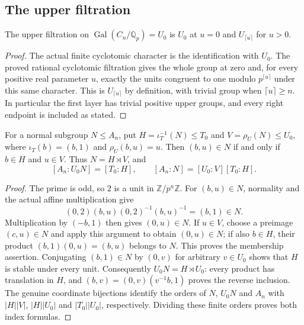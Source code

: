 \subsection{The upper filtration}

\begin{lemma}
\label{ft:cyclotomic-upper-filtration}
\leanok{}
The upper filtration on $\operatorname{Gal}(C_n/\mathbb Q_p)=U_0$ is
$U_0$ at $u=0$ and $U_{\lceil u\rceil}$ for $u>0$.
\end{lemma}
\begin{proof}
The actual finite cyclotomic character is the identification with $U_0$.
The proved rational cyclotomic filtration gives the whole group at zero
and, for every positive real parameter $u$, exactly the units congruent
to one modulo $p^{\lceil u\rceil}$ under this same character.
This is $U_{\lceil u\rceil}$ by definition, with trivial group when
$\lceil u\rceil\geq n$. In particular the first layer has trivial
positive upper groups, and every right endpoint is included as stated.
\end{proof}

\begin{lemma}
\label{ft:normal-affine-subgroup}
\leanok
For a normal subgroup $N\leq A_n$, put
$H=\iota_T^{-1}(N)\leq T_0$ and $V=\rho_U(N)\leq U_0$, where
$\iota_T(b)=(b,1)$ and $\rho_U(b,u)=u$.
Then $(b,u)\in N$ if and only if $b\in H$ and $u\in V$.
Thus $N=H\rtimes V$, and
\[
 [A_n:U_0N]=[T_0:H],\qquad
 [A_n:N]=[U_0:V][T_0:H].
\]
\end{lemma}
\begin{proof}
The prime is odd, so $2$ is a unit in $\mathbb Z/p^n\mathbb Z$.
For $(b,u)\in N$, normality and the actual affine multiplication give
\[
 (0,2)(b,u)(0,2)^{-1}(b,u)^{-1}=(b,1)\in N.
\]
Multiplication by $(-b,1)$ then gives $(0,u)\in N$.
If $u\in V$, choose a preimage $(c,u)\in N$ and apply this argument
to obtain $(0,u)\in N$; if also $b\in H$, their product
$(b,1)(0,u)=(b,u)$ belongs to $N$. This proves the membership assertion.
Conjugating $(b,1)\in N$ by $(0,v)$ for arbitrary $v\in U_0$ shows
that $H$ is stable under every unit. Consequently $U_0N=H\rtimes U_0$:
every product has translation in $H$, and
$(b,v)=(0,v)(v^{-1}b,1)$ proves the reverse inclusion.
The genuine coordinate bijections identify the orders of
$N$, $U_0N$ and $A_n$ with $|H||V|$, $|H||U_0|$ and
$|T_0||U_0|$, respectively. Dividing these finite orders proves
both index formulas.
\end{proof}

